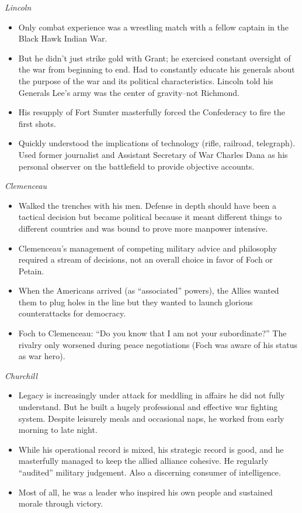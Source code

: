\documentclass[
]{article}
\begin{document}
\emph{Lincoln}

\begin{itemize}
\item
  Only combat experience was a wrestling match with a fellow captain in
  the Black Hawk Indian War.
\item
  But he didn't just strike gold with Grant; he exercised constant
  oversight of the war from beginning to end. Had to constantly educate
  his generals about the purpose of the war and its political
  characteristics. Lincoln told his Generals Lee's army was the center
  of gravity--not Richmond.
\item
  His resupply of Fort Sumter masterfully forced the Confederacy to fire
  the first shots.
\item
  Quickly understood the implications of technology (rifle, railroad,
  telegraph). Used former journalist and Assistant Secretary of War
  Charles Dana as his personal observer on the battlefield to provide
  objective accounts.
\end{itemize}

\emph{Clemenceau}

\begin{itemize}
\item
  Walked the trenches with his men. Defense in depth should have been a
  tactical decision but became political because it meant different
  things to different countries and was bound to prove more manpower
  intensive.
\item
  Clemenceau's management of competing military advice and philosophy
  required a stream of decisions, not an overall choice in favor of Foch
  or Petain.
\item
  When the Americans arrived (as ``associated'' powers), the Allies
  wanted them to plug holes in the line but they wanted to launch
  glorious counterattacks for democracy.
\item
  Foch to Clemenceau: ``Do you know that I am not your subordinate?''
  The rivalry only worsened during peace negotiations (Foch was aware of
  his status as war hero).
\end{itemize}

\emph{Churchill}

\begin{itemize}
\item
  Legacy is increasingly under attack for meddling in affairs he did not
  fully understand. But he built a hugely professional and effective war
  fighting system. Despite leisurely meals and occasional naps, he
  worked from early morning to late night.
\item
  While his operational record is mixed, his strategic record is good,
  and he masterfully managed to keep the allied alliance cohesive. He
  regularly ``audited'' military judgement. Also a discerning consumer
  of intelligence.
\item
  Most of all, he was a leader who inspired his own people and sustained
  morale through victory.
\end{itemize}
\end{document}
